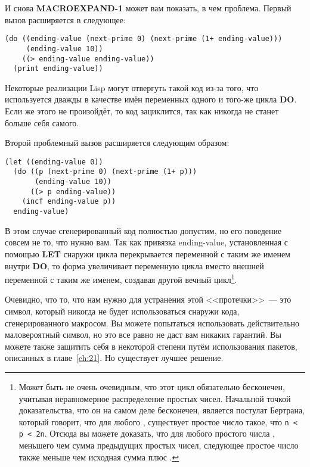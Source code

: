 И снова \textbf{MACROEXPAND-1} может вам показать, в чем проблема. Первый вызов
расширяется в следующее:

\begin{lstlisting}
(do ((ending-value (next-prime 0) (next-prime (1+ ending-value)))
     (ending-value 10))
    ((> ending-value ending-value))
  (print ending-value))
\end{lstlisting}

Некоторые реализации Lisp могут отвергуть такой код из-за того, что 
используется дважды в качестве имён переменных одного и того-же цикла \textbf{DO}. Если же
этого не произойдёт, то код зациклится, так как  никогда не станет
больше себя самого.

Второй проблемный вызов расширяется следующим образом:

\begin{lstlisting}
(let ((ending-value 0))
  (do ((p (next-prime 0) (next-prime (1+ p)))
       (ending-value 10))
      ((> p ending-value))
    (incf ending-value p))
  ending-value)
\end{lstlisting}

В этом случае сгенерированный код полностью допустим, но его поведение совсем не то, что
нужно вам. Так как привязка ending-value, установленная с помощью \textbf{LET} снаружи
цикла перекрывается переменной с таким же именем внутри \textbf{DO}, то форма  увеличивает переменную цикла  вместо внешней
переменной с таким же именем, создавая другой вечный цикл\footnote{Может быть не очень
  очевидным, что этот цикл обязательно бесконечен, учитывая неравномерное распределение
  простых чисел. Начальной точкой доказательства, что он на самом деле бесконечен,
  является постулат Бертрана, который говорит, что для любого , существует
  простое число  такое, что \lstinline!n < p < 2n!. Отсюда вы можете доказать, что
  для любого простого числа , меньшего чем сумма предыдущих простых чисел,
  следующее простое число  также меньше чем исходная сумма плюс .}.

Очевидно, что то, что нам нужно для устранения этой <<протечки>>~--- это символ, который
никогда не будет использоваться снаружи кода, сгенерированного макросом. Вы можете
попытаться использовать действительно маловероятный символ, но это все равно не даст вам
никаких гарантий. Вы можете также защитить себя в некоторой степени путём использования
пакетов, описанных в главе~\ref{ch:21}. Но существует лучшее решение.

